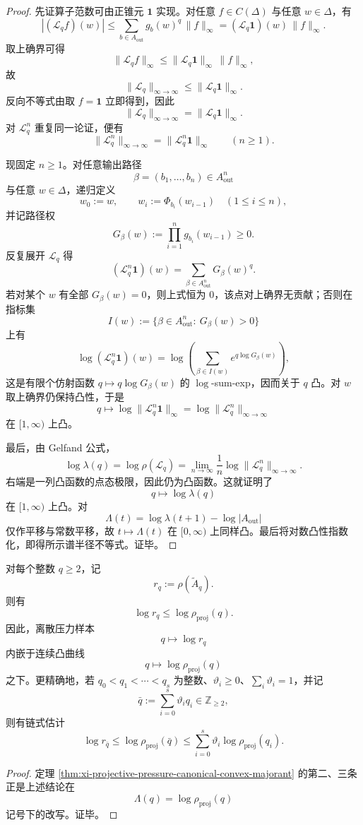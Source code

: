 \begin{proof}
先证算子范数可由正锥元 \(\mathbf 1\) 实现。对任意 \(f\in C(\Delta)\) 与任意 \(w\in\Delta\)，有
\[
|(\mathcal L_qf)(w)|
\le
\sum_{b\in A_{\mathrm{out}}}g_b(w)^q\,\|f\|_\infty
=
(\mathcal L_q\mathbf 1)(w)\,\|f\|_\infty.
\]
取上确界可得
\[
\|\mathcal L_qf\|_\infty\le \|\mathcal L_q\mathbf 1\|_\infty\,\|f\|_\infty,
\]
故
\[
\|\mathcal L_q\|_{\infty\to\infty}\le \|\mathcal L_q\mathbf 1\|_\infty.
\]
反向不等式由取 \(f=\mathbf 1\) 立即得到，因此
\[
\|\mathcal L_q\|_{\infty\to\infty}=\|\mathcal L_q\mathbf 1\|_\infty.
\]
对 \(\mathcal L_q^n\) 重复同一论证，便有
\[
\|\mathcal L_q^n\|_{\infty\to\infty}=\|\mathcal L_q^n\mathbf 1\|_\infty
\qquad (n\ge 1).
\]

现固定 \(n\ge 1\)。对任意输出路径
\[
\beta=(b_1,\dots,b_n)\in A_{\mathrm{out}}^n
\]
与任意 \(w\in\Delta\)，递归定义
\[
w_0:=w,
\qquad
w_i:=\Phi_{b_i}(w_{i-1})
\quad (1\le i\le n),
\]
并记路径权
\[
G_\beta(w):=\prod_{i=1}^{n}g_{b_i}(w_{i-1})\ge 0.
\]
反复展开 \(\mathcal L_q\) 得
\[
(\mathcal L_q^n\mathbf 1)(w)=\sum_{\beta\in A_{\mathrm{out}}^n}G_\beta(w)^q.
\]
若对某个 \(w\) 有全部 \(G_\beta(w)=0\)，则上式恒为 \(0\)，该点对上确界无贡献；否则在指标集
\[
I(w):=\{\beta\in A_{\mathrm{out}}^n:\ G_\beta(w)>0\}
\]
上有
\[
\log (\mathcal L_q^n\mathbf 1)(w)
=
\log\!\left(\sum_{\beta\in I(w)}e^{q\log G_\beta(w)}\right),
\]
这是有限个仿射函数 \(q\mapsto q\log G_\beta(w)\) 的 \(\log\)-sum-exp，因而关于 \(q\) 凸。对 \(w\) 取上确界仍保持凸性，于是
\[
q\longmapsto
\log\|\mathcal L_q^n\mathbf 1\|_\infty
=
\log\|\mathcal L_q^n\|_{\infty\to\infty}
\]
在 \([1,\infty)\) 上凸。

最后，由 Gelfand 公式，
\[
\log \lambda(q)
=
\log \rho(\mathcal L_q)
=
\lim_{n\to\infty}\frac{1}{n}\log\|\mathcal L_q^n\|_{\infty\to\infty}.
\]
右端是一列凸函数的点态极限，因此仍为凸函数。这就证明了
\[
q\longmapsto \log \lambda(q)
\]
在 \([1,\infty)\) 上凸。对
\[
\Lambda(t)=\log \lambda(t+1)-\log |A_{\mathrm{out}}|
\]
仅作平移与常数平移，故 \(t\mapsto \Lambda(t)\) 在 \([0,\infty)\) 上同样凸。最后将对数凸性指数化，即得所示谱半径不等式。证毕。
\end{proof}

\begin{corollary}\label{cor:xi-time-part50dc-moment-kernel-convex-envelope}
对每个整数 \(q\ge 2\)，记
\[
r_q:=\rho(\widetilde A_q).
\]
则有
\[
\log r_q\le \log \rho_{\mathrm{proj}}(q).
\]
因此，离散压力样本
\[
q\longmapsto \log r_q
\]
内嵌于连续凸曲线
\[
q\longmapsto \log \rho_{\mathrm{proj}}(q)
\]
之下。更精确地，若 \(q_0<q_1<\cdots<q_s\) 为整数、\(\vartheta_i\ge 0\)、\(\sum_i\vartheta_i=1\)，并记
\[
\bar q:=\sum_{i=0}^s\vartheta_i q_i\in\mathbb Z_{\ge 2},
\]
则有链式估计
\[
\log r_{\bar q}
\le
\log \rho_{\mathrm{proj}}(\bar q)
\le
\sum_{i=0}^s \vartheta_i\log \rho_{\mathrm{proj}}(q_i).
\]
\end{corollary}
\begin{proof}
定理 \ref{thm:xi-projective-pressure-canonical-convex-majorant} 的第二、三条正是上述结论在
\[
\Lambda(q)=\log\rho_{\mathrm{proj}}(q)
\]
记号下的改写。证毕。
\end{proof}

